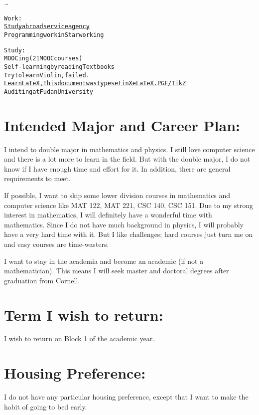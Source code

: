 	\dots
	
	\begin{alltt}
	Work:
	\st{Study abroad service agency}
	Programming work in Starworking
	
	Study:
	MOOCing (21 MOOC courses)
	Self-learning by reading Textbooks
	Try to learn Violin, failed.
	\st{Learn LaTeX, This document was typeset in XeLaTeX. PGF/TikZ}
	Auditing at Fudan University
	\end{alltt}
	
	\section*{Intended Major and Career Plan:}
	I intend to double major in mathematics and physics. I still love computer science and there is a lot more to learn in the field. But with the double major, I do not know if I have enough time and effort for it. In addition, there are general requirements to meet.
	
	If possible, I want to skip some lower division courses in mathematics and computer science like MAT 122, MAT 221, CSC 140, CSC 151. Due to my strong interest in mathematics, I will definitely have a wonderful time with mathematics. Since I do not have much background in physics, I will probably have a very hard time with it. But I like challenges; hard courses just turn me on and easy courses are time-wasters.
	
	I want to stay in the academia and become an academic (if not a mathematician). This means I will seek master and doctoral degrees after graduation from Cornell.
	
	\section*{Term I wish to return:}
	I wish to return on Block 1 of the  academic year.
	
	\section*{Housing Preference:}
	I do not have any particular housing preference, except that I want to make the habit of going to bed early.
	
	\nocite{*}
	
	\printbibliography
